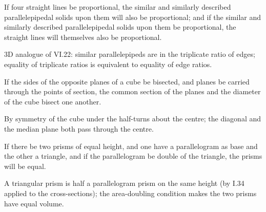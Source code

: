 \begin{claim}
\label{prop:XI.37}
If four straight lines be proportional, the similar and similarly
described parallelepipedal solids upon them will also be
proportional; and if the similar and similarly described
parallelepipedal solids upon them be proportional, the straight lines
will themselves also be proportional.
\end{claim}
\begin{evidence}[Proof of XI.37]
\label{ev:XI.37}
3D analogue of VI.22: similar parallelepipeds are in the triplicate
ratio of edges; equality of triplicate ratios is equivalent to
equality of edge ratios.
\end{evidence}

\begin{claim}
\label{prop:XI.38}
If the sides of the opposite planes of a cube be bisected, and planes
be carried through the points of section, the common section of the
planes and the diameter of the cube bisect one another.
\end{claim}
\begin{evidence}[Proof of XI.38]
\label{ev:XI.38}
By symmetry of the cube under the half-turns about the centre; the
diagonal and the median plane both pass through the centre.
\end{evidence}

\begin{claim}
\label{prop:XI.39}
If there be two prisms of equal height, and one have a parallelogram
as base and the other a triangle, and if the parallelogram be double
of the triangle, the prisms will be equal.
\end{claim}
\begin{evidence}[Proof of XI.39]
\label{ev:XI.39}
A triangular prism is half a parallelogram prism on the same height
(by I.34 applied to the cross-sections); the area-doubling condition
makes the two prisms have equal volume.
\end{evidence}
